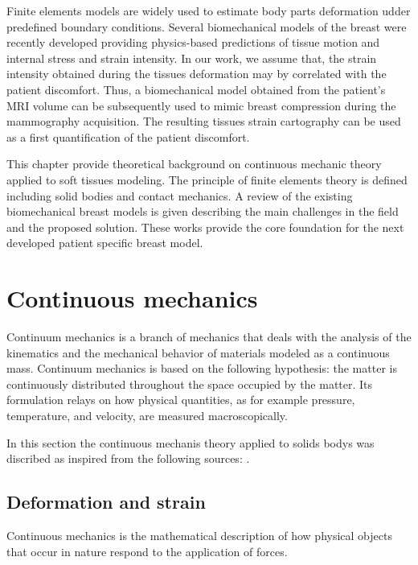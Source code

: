 

Finite elements models are widely used to estimate body parts deformation udder predefined boundary conditions. Several biomechanical models of the breast were recently developed providing physics-based predictions of tissue motion and internal stress and strain intensity.  In our work, we assume that, the strain intensity obtained during the tissues deformation may by correlated with the patient discomfort. Thus, a biomechanical model obtained from the patient's MRI volume can be subsequently used to mimic breast compression during the mammography acquisition. The resulting tissues strain cartography can be used as a first quantification of the patient discomfort.

This chapter provide theoretical background on continuous mechanic theory applied to soft tissues modeling. The principle of finite elements theory is defined including solid bodies and contact mechanics. A review of the existing biomechanical breast models is given describing the main challenges in the field and the proposed solution. These works provide the core foundation for the next developed patient specific breast model. 
      
\clearpage
\section{Continuous mechanics}
\label{section:continuousmechanics}
Continuum mechanics is a branch of mechanics that deals with the analysis of the kinematics and the mechanical behavior of materials modeled as a continuous mass. Continuum mechanics is based on the following hypothesis: the matter is continuously distributed throughout the space occupied by the matter. Its formulation relays on how physical quantities, as for example pressure, temperature, and velocity, are measured macroscopically.

In this section the continuous mechanis theory applied to solids bodys was discribed as inspired from the following sources: \cite{belytschko_nonlinear_2013,abeyaratne_continuum_2012}.
\subsection{Deformation and strain}\label{subsection:defromationandstrain}
Continuous mechanics is the mathematical description of how physical objects that occur in nature respond to the application of forces.

